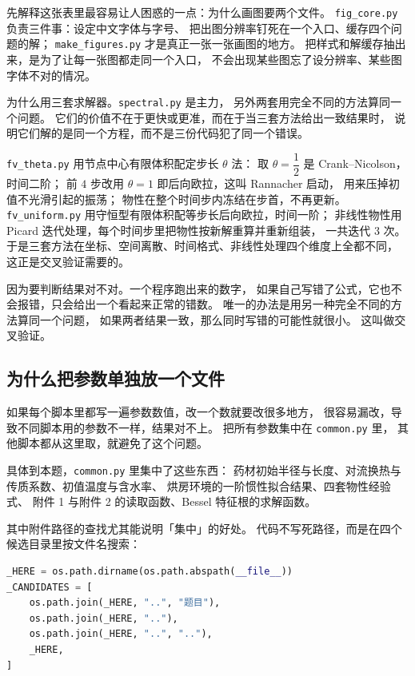 先解释这张表里最容易让人困惑的一点：为什么画图要两个文件。
\texttt{fig\_core.py} 负责三件事：设定中文字体与字号、
把出图分辨率钉死在一个入口、缓存四个问题的解；
\texttt{make\_figures.py} 才是真正一张一张画图的地方。
把样式和解缓存抽出来，是为了让每一张图都走同一个入口，
不会出现某些图忘了设分辨率、某些图字体不对的情况。

为什么用三套求解器。\texttt{spectral.py} 是主力，
另外两套用完全不同的方法算同一个问题。
它们的价值不在于更快或更准，而在于当三套方法给出一致结果时，
说明它们解的是同一个方程，而不是三份代码犯了同一个错误。

\texttt{fv\_theta.py} 用节点中心有限体积配定步长 $\theta$ 法：
取 $\theta=\dfrac{1}{2}$ 是 Crank--Nicolson，时间二阶；
前 $4$ 步改用 $\theta=1$ 即后向欧拉，这叫 Rannacher 启动，
用来压掉初值不光滑引起的振荡；
物性在整个时间步内冻结在步首，不再更新。
\texttt{fv\_uniform.py} 用守恒型有限体积配等步长后向欧拉，时间一阶；
非线性物性用 Picard 迭代处理，每个时间步里把物性按新解重算并重新组装，
一共迭代 $3$ 次。
于是三套方法在坐标、空间离散、时间格式、非线性处理四个维度上全都不同，
这正是交叉验证需要的。

因为要判断结果对不对。一个程序跑出来的数字，
如果自己写错了公式，它也不会报错，只会给出一个看起来正常的错数。
唯一的办法是用另一种完全不同的方法算同一个问题，
如果两者结果一致，那么同时写错的可能性就很小。
这叫做交叉验证。

\subsection{为什么把参数单独放一个文件}

如果每个脚本里都写一遍参数数值，改一个数就要改很多地方，
很容易漏改，导致不同脚本用的参数不一样，结果对不上。
把所有参数集中在 \texttt{common.py} 里，
其他脚本都从这里取，就避免了这个问题。

具体到本题，\texttt{common.py} 里集中了这些东西：
药材初始半径与长度、对流换热与传质系数、初值温度与含水率、
烘房环境的一阶惯性拟合结果、四套物性经验式、
附件 1 与附件 2 的读取函数、Bessel 特征根的求解函数。

其中附件路径的查找尤其能说明「集中」的好处。
代码不写死路径，而是在四个候选目录里按文件名搜索：

\begin{lstlisting}[language=Python]
_HERE = os.path.dirname(os.path.abspath(__file__))
_CANDIDATES = [
    os.path.join(_HERE, "..", "题目"),
    os.path.join(_HERE, ".."),
    os.path.join(_HERE, "..", ".."),
    _HERE,
]
\end{lstlisting}

